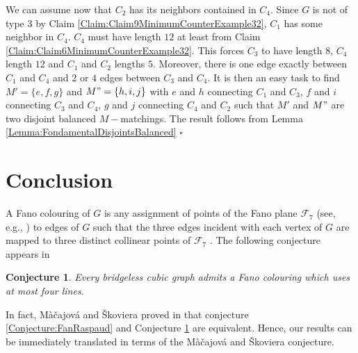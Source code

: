 \documentclass{elsart}
\theoremstyle{plain} \theoremheaderfont{\scshape}
\newtheorem{Conj}[Thm]{{\bf Conjecture}}
\newenvironment{Prf}{{\bf \noindent Proof } }{\hfill$\square$\\}
\begin{document}
\begin{Prf}
We can assume now that $C_2$ has its neighbors contained in $C_4$.
Since $G$ is not of type $3$ by Claim
\ref{Claim:Claim9MinimumCounterExample32}, $C_1$ has some neighbor
in $C_4$. $C_4$ must have length $12$ at least from Claim
\ref{Claim:Claim6MinimumCounterExample32}. This forces $C_3$ to have
length $8$, $C_4$
 length $12$ and $C_1$ and $C_2$ lengths $5$. Moreover, there is one
 edge exactly between $C_1$ and $C_4$ and $2$ or $4$ edges between
 $C_3$ and $C_4$. It is then an easy task to find $M'=\{e,f,g\}$ and
 $M"=\{h,i,j\}$ with $e$ and $h$ connecting $C_1$ and $C_3$, $f$ and $i$ connecting
 $C_3$ and $C_4$, $g$ and $j$ connecting $C_4$ and $C_2$ such that
 $M'$ and $M"$ are two disjoint balanced $M-$matchings. The result follows from
Lemma \ref{Lemma:FondamentalDisjointsBalanced}
\end{Prf}

\section{Conclusion}

A Fano colouring of $G$ is any assignment of points of the Fano
plane $\mathcal F_7$ (see, e.g., \cite{MacSko}) to edges of $G$ such
that the three edges incident with each vertex of $G$ are mapped to
three distinct collinear points of $\mathcal F_7$ . The following
conjecture appears in \cite{MacSko}

\begin{Conj}\cite{MacSko} \label{Conjecture:MacajovaSkoviera} Every
bridgeless cubic graph admits a  Fano colouring which uses at most
four lines.
\end{Conj}

In fact, M\`{a}\v{c}ajov\'{a} and  \v{S}koviera  proved in
\cite{MacSko} that conjecture \ref{Conjecture:FanRaspaud} and
Conjecture \ref{Conjecture:MacajovaSkoviera} are equivalent. Hence,
our results can be immediately translated in terms of the
M\`{a}\v{c}ajov\'{a} and \v{S}koviera conjecture.









\end{document}
